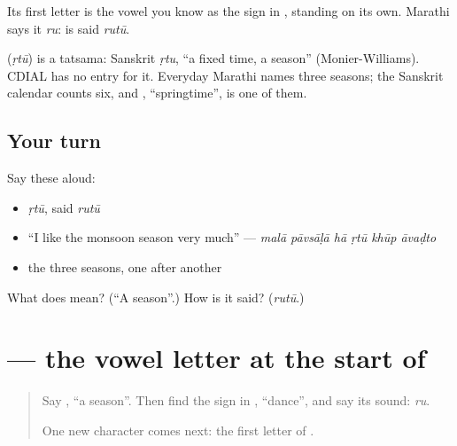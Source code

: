 Its first letter is the vowel you know as the sign \textbf{} in \textbf{}, standing on its own. Marathi says it \emph{ru}: \textbf{} is said \emph{rutū}.

\begin{cousinweb}
\textbf{} (\emph{ṛtū}) is a tatsama: Sanskrit \emph{ṛtu}, \textquotedblleft{}a fixed time, a season\textquotedblright{} (Monier-Williams). CDIAL has no entry for it. Everyday Marathi names three seasons; the Sanskrit calendar counts six, and \textbf{}, \textquotedblleft{}springtime\textquotedblright{}, is one of them.
\end{cousinweb}

\subsection*{Your turn}
Say these aloud:

\begin{itemize}
\raggedright
  \item \emph{ṛtū}, said \emph{rutū}
  \item \textquotedblleft{}I like the monsoon season very much\textquotedblright{} — \emph{malā pāvsāḷā hā ṛtū khūp āvaḍto}
  \item the three seasons, one after another
\end{itemize}

\begin{tcolorbox}[breakable,colback=teal!4,colframe=teal!35!black,title={Before you move on}]
What does \textbf{} mean? (\textquotedblleft{}A season\textquotedblright{}.) How is it said? (\emph{rutū}.)
\end{tcolorbox}
\section[\texorpdfstring{\mr{ऋ} (ṛ (Marathi ru))}{ऋ (ṛ (Marathi ru))}]{ — the vowel letter at the start of }

\label{lesson:MR-W279-letter-vocalic-r}



\begin{quote}
Say \textbf{}, \textquotedblleft{}a season\textquotedblright{}. Then find the sign \textbf{} in \textbf{}, \textquotedblleft{}dance\textquotedblright{}, and say its sound: \emph{ru}.

One new character comes next: the first letter of \textbf{}.
\end{quote}


